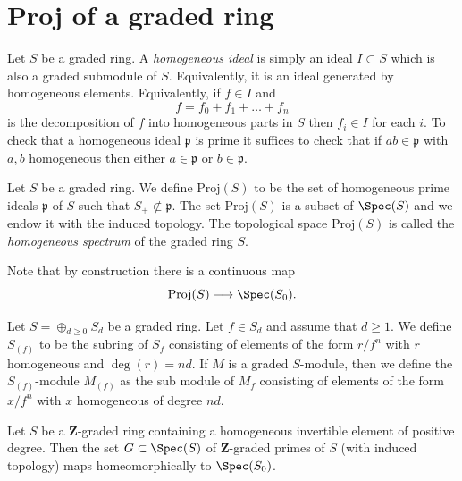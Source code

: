 \section{Proj of a graded ring}
\label{section-proj}

\noindent
Let $S$ be a graded ring.
A {\it homogeneous ideal} is simply an ideal
$I \subset S$ which is also a graded submodule of $S$.
Equivalently, it is an ideal generated by homogeneous elements.
Equivalently, if $f \in I$ and
$$
f = f_0 + f_1 + \ldots + f_n
$$
is the decomposition of $f$ into homogeneous parts in $S$ then $f_i \in I$
for each $i$. To check that a homogeneous ideal $\mathfrak p$
is prime it suffices to check that if $ab \in \mathfrak p$
with $a, b$ homogeneous then either $a \in \mathfrak p$ or
$b \in \mathfrak p$.

\begin{definition}
\label{definition-proj}
Let $S$ be a graded ring.
We define $\text{Proj}(S)$ to be the set of homogeneous
prime ideals $\mathfrak p$ of $S$ such that
$S_{+} \not \subset \mathfrak p$.
The set $\text{Proj}(S)$ is a subset of $\Spec(S)$
and we endow it with the induced topology.
The topological space $\text{Proj}(S)$ is called the
{\it homogeneous spectrum} of the graded ring $S$.
\end{definition}

\noindent
Note that by construction there is a continuous map
$$
\text{Proj}(S) \longrightarrow \Spec(S_0).
$$

\medskip\noindent
Let $S = \oplus_{d \geq 0} S_d$ be a graded ring.
Let $f\in S_d$ and assume that $d \geq 1$.
We define $S_{(f)}$ to be the subring of $S_f$
consisting of elements of the form $r/f^n$ with $r$ homogeneous and
$\deg(r) = nd$. If $M$ is a graded $S$-module,
then we define the $S_{(f)}$-module $M_{(f)}$ as the
sub module of $M_f$ consisting of elements of
the form $x/f^n$ with $x$ homogeneous of degree $nd$.

\begin{lemma}
\label{lemma-Z-graded}
Let $S$ be a $\mathbf{Z}$-graded ring containing a homogeneous
invertible element of positive degree. Then the set
$G \subset \Spec(S)$ of $\mathbf{Z}$-graded primes of $S$
(with induced topology) maps homeomorphically to $\Spec(S_0)$.
\end{lemma}

